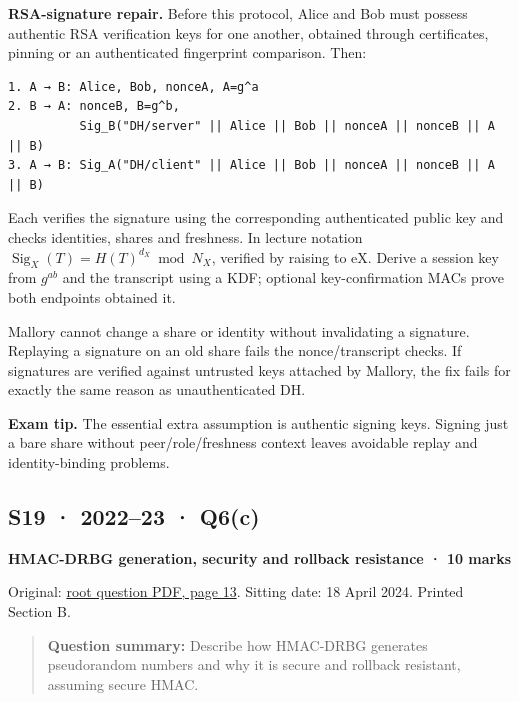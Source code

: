 \documentclass[11pt,a4paper]{article}
\begin{document}
\textbf{RSA-signature repair.} Before this protocol,\allowbreak{} Alice and Bob must possess authentic RSA verification keys for one another,\allowbreak{} obtained through certificates,\allowbreak{} pinning or an authenticated fingerprint comparison. Then:



\begin{Verbatim}[breaklines=true,breakanywhere=true,fontsize=\small,frame=single,rulecolor=\color{PanelBorder}]
1. A → B: Alice, Bob, nonceA, A=g^a
2. B → A: nonceB, B=g^b,
          Sig_B("DH/server" || Alice || Bob || nonceA || nonceB || A || B)
3. A → B: Sig_A("DH/client" || Alice || Bob || nonceA || nonceB || A || B)
\end{Verbatim}

Each verifies the signature using the corresponding authenticated public key and checks identities,\allowbreak{} shares and freshness. In lecture notation \(\operatorname{Sig}_X(T)=H(T)^{d_X}\bmod N_X\),\allowbreak{} verified by raising to eX. Derive a session key from \(g^{ab}\) and the transcript using a KDF; optional key-confirmation MACs prove both endpoints obtained it.


Mallory cannot change a share or identity without invalidating a signature. Replaying a signature on an old share fails the nonce/\allowbreak{}transcript checks. If signatures are verified against untrusted keys attached by Mallory,\allowbreak{} the fix fails for exactly the same reason as unauthenticated DH.



{\color{ForestGreen}\textbf{Exam tip.} The essential extra assumption is authentic signing keys. Signing just a bare share without peer/\allowbreak{}role/\allowbreak{}freshness context leaves avoidable replay and identity-binding problems.}




\clearpage
\subsection{S19 · 2022–23 · Q6(c)}\label{s19}

\textbf{HMAC-DRBG generation,\allowbreak{} security and rollback resistance · 10 marks}


Original: \href{../../CSE405-Security_Merged.pdf\#page=13}{root question PDF,\allowbreak{} page 13}. Sitting date: 18 April 2024. Printed Section B.



\begin{quote}\small

\textbf{Question summary:} Describe how HMAC-DRBG generates pseudorandom numbers and why it is secure and rollback resistant,\allowbreak{} assuming secure HMAC.



\end{quote}
\end{document}
